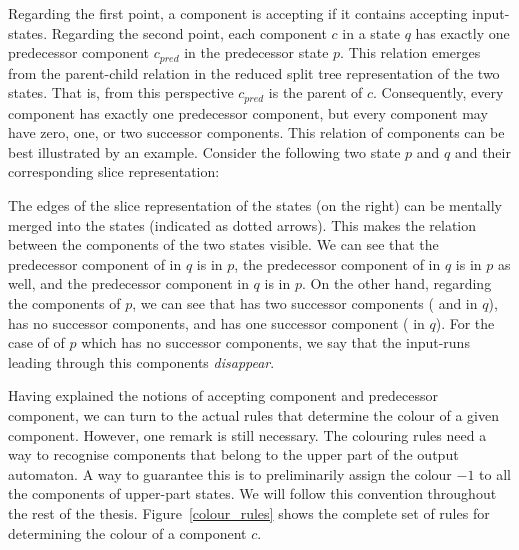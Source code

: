 Regarding the first point, a component is accepting if it contains accepting input-states. Regarding the second point, each component $c$ in a state $q$ has exactly one predecessor component $c_{pred}$ in the predecessor state $p$. This relation emerges from the parent-child relation in the reduced split tree representation of the two states. That is, from this perspective $c_{pred}$ is the parent of $c$. Consequently, every component has exactly one predecessor component, but every component may have zero, one, or two successor components. This relation of components can be best illustrated by an example. Consider the following two state $p$ and $q$ and their corresponding slice representation:

\begin{center}
\PredCompsFirst
\end{center}

The edges of the slice representation of the states (on the right) can be mentally merged into the states (indicated as dotted arrows). This makes the relation between the components of the two states visible. We can see that the predecessor component of  in $q$ is  in $p$, the predecessor component of  in $q$ is  in $p$ as well, and the predecessor component  in $q$ is  in $p$. On the other hand, regarding the components of $p$, we can see that  has two successor components ( and  in $q$),  has no successor components, and  has one successor component ( in $q$). For the case of  of $p$ which has no successor components, we say that the input-runs leading through this components \textit{disappear}.

Having explained the notions of accepting component and predecessor component, we can turn to the actual rules that determine the colour of a given component. However, one remark is still necessary. The colouring rules need a way to recognise components that belong to the upper part of the output automaton. A way to guarantee this is to preliminarily assign the colour $-1$ to all the components of upper-part states. We will follow this convention throughout the rest of the thesis. Figure~\ref{colour_rules} shows the complete set of rules for determining the colour of a component $c$.

